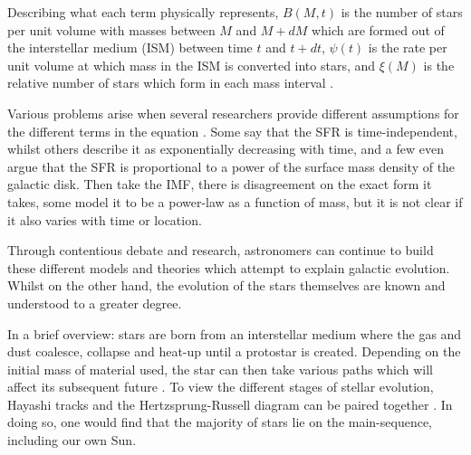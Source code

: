 \documentclass[12pt, twocolumn]{revtex4}    %
\begin{document}
Describing what each term physically represents, $B(M,t)$ is the number of stars per unit volume with masses between $M$ and $M+dM$ which are formed out of the interstellar medium (ISM) between time $t$ and $t+dt$, $\psi(t)$ is the rate per unit volume at which mass in the ISM is converted into stars, and $\xi(M)$ is the relative number of stars which form in each mass interval \cite{carroll_astro}. 

Various problems arise when several researchers provide different assumptions for the different terms in the equation \cite{carroll_astro}. Some say that the SFR is time-independent, whilst others describe it as exponentially decreasing with time, and a few even argue that the SFR is proportional to a power of the surface mass density of the galactic disk. Then take the IMF, there is disagreement on the exact form it takes, some model it to be a power-law as a function of mass, but it is not clear if it also varies with time or location.

Through contentious debate and research, astronomers can continue to build these different models and theories which attempt to explain galactic evolution. Whilst on the other hand, the evolution of the stars themselves are known and understood to a greater degree. 

In a brief overview: stars are born from an interstellar medium where the gas and dust coalesce, collapse and heat-up until a protostar is created. Depending on the initial mass of material used, the star can then take various paths which will affect its subsequent future \cite{mccoy_stars}. To view the different stages of stellar evolution, Hayashi tracks and the Hertzsprung-Russell diagram can be paired together \cite{carroll_astro}. In doing so, one would find that the majority of stars lie on the main-sequence, including our own Sun. 
\end{document}
